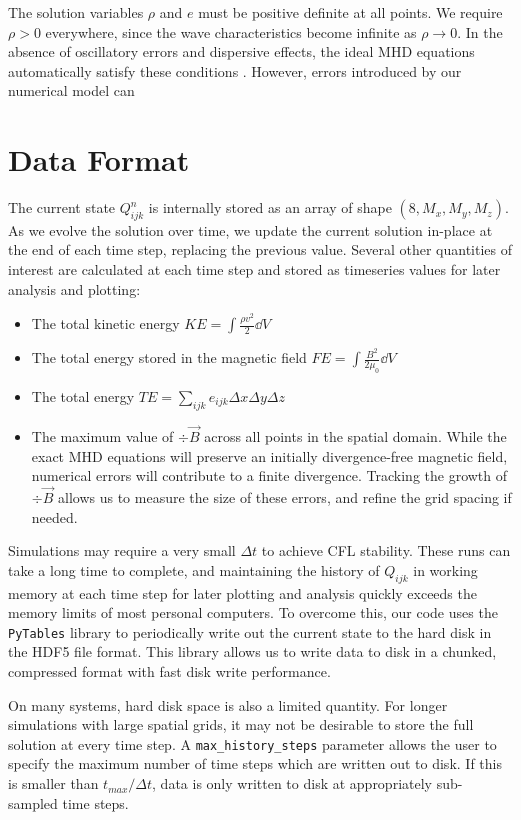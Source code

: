 \documentclass[%
 reprint,
 amsmath,amssymb,
 aps,
]{revtex4-2}
\begin{document}
The solution variables $\rho$ and $e$ must be positive definite at all points. We require $\rho > 0$ everywhere, since the wave characteristics become infinite as $\rho \rightarrow 0$. In the absence of oscillatory errors and dispersive effects, the ideal MHD equations automatically satisfy these conditions . However, errors introduced by our numerical model can 

\section{Data Format}

The current state $Q_{ijk} ^n$ is internally stored as an array of shape $(8, M_x, M_y, M_z)$. As we evolve the solution over time, we update the current solution in-place at the end of each time step, replacing the previous value. Several other quantities of interest are calculated at each time step and stored as timeseries values for later analysis and plotting:
\begin{itemize}
\item The total kinetic energy $KE = \int \frac{\rho v^2}{2} \dd V$
\item The total energy stored in the magnetic field $FE = \int \frac{B^2}{2 \mu_0} \dd V$
\item The total energy $TE = \sum_{ijk} e_{ijk} \Delta x \Delta y \Delta z$
\item The maximum value of $\div \vec B$ across all points in the spatial domain. While the exact MHD equations will preserve an initially divergence-free magnetic field, numerical errors will contribute to a finite divergence. Tracking the growth of $\div \vec B$ allows us to measure the size of these errors, and refine the grid spacing if needed.
\end{itemize}

Simulations may require a very small $\Delta t$ to achieve CFL stability. These runs can take a long time to complete, and maintaining the history of $Q_{ijk}$ in working memory at each time step for later plotting and analysis quickly exceeds the memory limits of most personal computers. To overcome this, our code uses the \texttt{PyTables} library to periodically write out the current state to the hard disk in the HDF5 file format. This library allows us to write data to disk in a chunked, compressed format with fast disk write performance.

On many systems, hard disk space is also a limited quantity. For longer simulations with large spatial grids, it may not be desirable to store the full solution at every time step. A \texttt{max\_history\_steps} parameter allows the user to specify the maximum number of time steps which are written out to disk. If this is smaller than $t_{max} / \Delta t$, data is only written to disk at appropriately sub-sampled time steps.
\end{document}
